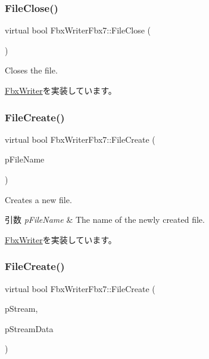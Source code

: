 \subsubsection{\texorpdfstring{File\+Close()}{FileClose()}}
{\footnotesize\ttfamily virtual bool Fbx\+Writer\+Fbx7\+::\+File\+Close (\begin{DoxyParamCaption}{ }\end{DoxyParamCaption})\hspace{0.3cm}{\ttfamily [virtual]}}

Closes the file. 

\hyperlink{class_fbx_writer_a0387142f55d0020fd5360759c12aa121}{Fbx\+Writer}を実装しています。

\mbox{\label{class_fbx_writer_fbx7_ab76d4fdd92efb2a6506bde058bfde28e}} 
\subsubsection{\texorpdfstring{File\+Create()}{FileCreate()}\hspace{0.1cm}{\footnotesize\ttfamily [1/2]}}
{\footnotesize\ttfamily virtual bool Fbx\+Writer\+Fbx7\+::\+File\+Create (\begin{DoxyParamCaption}\item[{char $\ast$}]{p\+File\+Name }\end{DoxyParamCaption})\hspace{0.3cm}{\ttfamily [virtual]}}

Creates a new file. 
\begin{DoxyParams}{引数}
{\em p\+File\+Name} & The name of the newly created file. \\
\hline
\end{DoxyParams}


\hyperlink{class_fbx_writer_abe6729227cd6e3be5ee3ab0c1b8b0eda}{Fbx\+Writer}を実装しています。

\mbox{\label{class_fbx_writer_fbx7_a0e04e17fe0912786150b2728b76871bf}} 
\subsubsection{\texorpdfstring{File\+Create()}{FileCreate()}\hspace{0.1cm}{\footnotesize\ttfamily [2/2]}}
{\footnotesize\ttfamily virtual bool Fbx\+Writer\+Fbx7\+::\+File\+Create (\begin{DoxyParamCaption}\item[{\hyperlink{class_fbx_stream}{Fbx\+Stream} $\ast$}]{p\+Stream,  }\item[{void $\ast$}]{p\+Stream\+Data }\end{DoxyParamCaption})\hspace{0.3cm}{\ttfamily [virtual]}}

